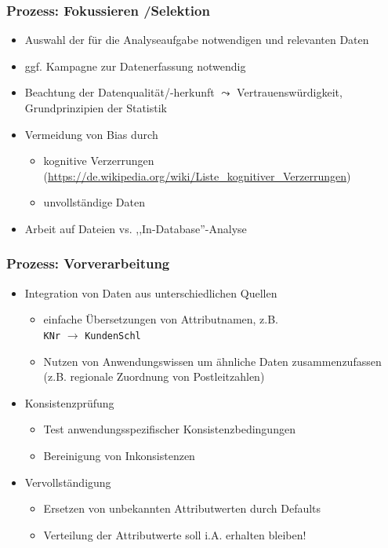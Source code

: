 
\begin{frame}
\frametitle{Prozess: Fokussieren /Selektion}

\begin{itemize}
\item Auswahl der für die Analyseaufgabe notwendigen und relevanten Daten
\item ggf. Kampagne zur Datenerfassung notwendig
\item Beachtung der Datenqualität/-herkunft $\leadsto$ Vertrauenswürdigkeit, Grundprinzipien der Statistik
\item Vermeidung von Bias durch
\begin{itemize}
\item kognitive Verzerrungen (\url{https://de.wikipedia.org/wiki/Liste_kognitiver_Verzerrungen})
\item unvollständige Daten
\end{itemize}
\item Arbeit auf Dateien vs. ,,In-Database''-Analyse
\end{itemize}

\end{frame}


\begin{frame}
\frametitle{Prozess: Vorverarbeitung}

\begin{itemize}
\item Integration von Daten aus unterschiedlichen Quellen
\begin{itemize}
\item einfache Übersetzungen  von Attributnamen, z.B.\\
 \texttt{KNr} $\longrightarrow$ \texttt{KundenSchl}
\item Nutzen von Anwendungswissen um ähnliche Daten zusammenzufassen (z.B.
regionale Zuordnung von Postleitzahlen)
\end{itemize}
\item Konsistenzprüfung
\begin{itemize}
\item Test anwendungsspezifischer Konsistenzbedingungen
\item Bereinigung von Inkonsistenzen
\end{itemize}
\item Vervollständigung
\begin{itemize}
\item Ersetzen von unbekannten Attributwerten durch Defaults
\item Verteilung der Attributwerte soll i.A. erhalten bleiben!
\end{itemize}
\end{itemize}

\end{frame}

